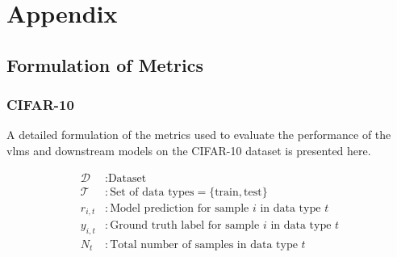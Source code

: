 \documentclass[../ShajiS_RnDReport.tex]{subfiles}
\begin{document}
\section{Appendix}
\label{sec:appendix}





\subsection{Formulation of Metrics}

\subsubsection{CIFAR-10}
\label{sec:appendix:metrics:cifar10}
A detailed formulation of the metrics used to evaluate the performance of the \glspl{vlm} and downstream models on the CIFAR-10 dataset is presented here.

\begin{align*}
    \mathcal{D} &\colon \text{Dataset} \\
    \mathcal{T} &\colon \text{Set of data types} = \{\text{train}, \text{test}\} \\
    r_{i,t} &\colon \text{Model prediction for sample } i \text{ in data type } t \\
    y_{i,t} &\colon \text{Ground truth label for sample } i \text{ in data type } t \\
    N_t &\colon \text{Total number of samples in data type } t
\end{align*}
\end{document}
